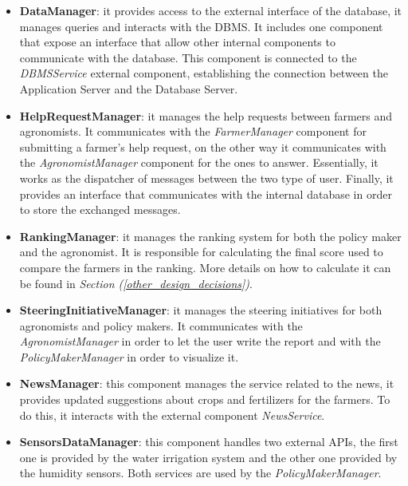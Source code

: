 \documentclass[table, 12pt]{article}
\begin{document}
\begin{itemize}
    \item \textbf{DataManager}: it provides access to the external interface of the database, it manages queries and interacts with the DBMS.
    It includes one component that expose an interface that allow other internal components to communicate with the database.
    This component is connected to the \textit{DBMSService} external component, establishing the connection between the Application Server and the Database Server.
    \item \textbf{HelpRequestManager}: it manages the help requests between farmers and agronomists.
    It communicates with the \textit{FarmerManager} component for submitting a farmer's help request, on the other way it communicates with the \textit{AgronomistManager} component for the ones to answer. Essentially, it works as the dispatcher of messages between the two type of user.
    Finally, it provides an interface that communicates with the internal database in order to store the exchanged messages.
    \item \textbf{RankingManager}: it manages the ranking system for both the policy maker and the agronomist.
    It is responsible for calculating the final score used to compare the farmers in the ranking.
    More details on how to calculate it can be found in \textit{Section (\ref{other_design_decisions})}.
    \item \textbf{SteeringInitiativeManager}: it manages the steering initiatives for both agronomists and policy makers. It communicates with the \textit{AgronomistManager} in order to let the user write the report and with the \textit{PolicyMakerManager} in order to visualize it.
    \item \textbf{NewsManager}: this component manages the service related to the news, it provides updated suggestions about crops and fertilizers for the farmers.
    To do this, it interacts with the external component \textit{NewsService}.
    \item \textbf{SensorsDataManager}: this component handles two external APIs, the first one is provided by the water irrigation system and the other one provided by the humidity sensors.
    Both services are used by the \textit{PolicyMakerManager}.
\end{itemize}
\end{document}
